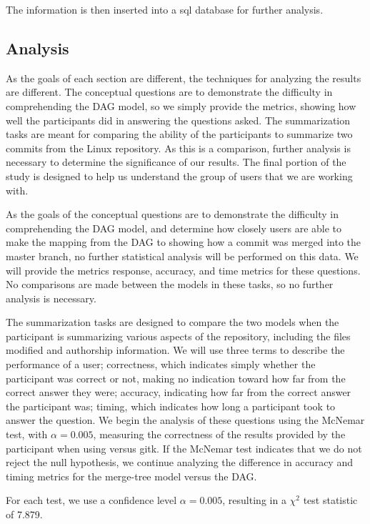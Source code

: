 The information is then inserted into a sql database for further
analysis.

\subsection{Analysis}

As the goals of each section are different, the techniques for analyzing
the results are different. The conceptual questions are to demonstrate
the difficulty in comprehending the DAG model, so we simply provide the
metrics, showing how well the participants did in answering the
questions asked. The summarization tasks are meant for comparing the
ability of the participants to summarize two commits from the Linux
repository. As this is a comparison, further analysis is necessary to
determine the significance of our results. The final portion of the
study is designed to help us understand the group of users that we are
working with.

As the goals of the conceptual questions are to demonstrate the
difficulty in comprehending the DAG model, and determine how closely
users are able to make the mapping from the DAG to showing how a commit
was merged into the master branch, no further statistical analysis will
be performed on this data. We will provide the metrics response,
accuracy, and time metrics for these questions. No comparisons are made
between the models in these tasks, so no further analysis is necessary.

The summarization tasks are designed to compare the two models when the
participant is summarizing various aspects of the repository, including
the files modified and authorship information. We will use three terms
to describe the performance of a user; correctness, which indicates
simply whether the participant was correct or not, making no indication
toward how far from the correct answer they were; accuracy, indicating
how far from the correct answer the participant was; timing, which
indicates how long a participant took to answer the question. We begin
the analysis of these questions using the McNemar test, with $\alpha =
0.005$, measuring the correctness of the results provided by the
participant when using \tool versus gitk.
If the McNemar test indicates that we do not reject the null hypothesis,
we continue analyzing the difference in accuracy and timing metrics for
the merge-tree model versus the DAG.

For each test, we use a confidence level $\alpha = 0.005$, resulting in
a $\chi^2$ test statistic of 7.879.

